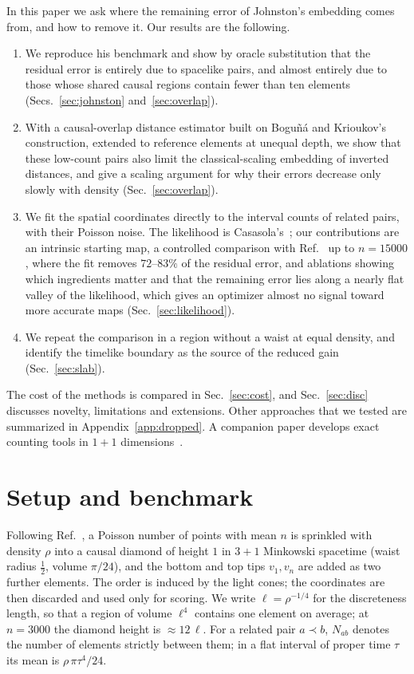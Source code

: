 \documentclass[prd,twocolumn,superscriptaddress,nofootinbib,amsmath,amssymb,floatfix]{revtex4-2}
\begin{document}
In this paper we ask where the remaining error of Johnston's embedding comes from, and how to remove it. Our results are the following.
\begin{enumerate}
\item We reproduce his benchmark and show by oracle substitution that the residual error is entirely due to spacelike pairs, and almost entirely due to those whose shared causal regions contain fewer than ten elements (Secs.~\ref{sec:johnston} and~\ref{sec:overlap}).
\item With a causal-overlap distance estimator built on Bogu\~n\'a and Krioukov's construction, extended to reference elements at unequal depth, we show that these low-count pairs also limit the classical-scaling embedding of inverted distances, and give a scaling argument for why their errors decrease only slowly with density (Sec.~\ref{sec:overlap}).
\item We fit the spatial coordinates directly to the interval counts of related pairs, with their Poisson noise. The likelihood is Casasola's~\cite{Casasola26}; our contributions are an intrinsic starting map, a controlled comparison with Ref.~\cite{Johnston25} up to $n=15000$, where the fit removes $72$--$83\%$ of the residual error, and ablations showing which ingredients matter and that the remaining error lies along a nearly flat valley of the likelihood, which gives an optimizer almost no signal toward more accurate maps (Sec.~\ref{sec:likelihood}).
\item We repeat the comparison in a region without a waist at equal density, and identify the timelike boundary as the source of the reduced gain (Sec.~\ref{sec:slab}).
\end{enumerate}
The cost of the methods is compared in Sec.~\ref{sec:cost}, and Sec.~\ref{sec:disc} discusses novelty, limitations and extensions. Other approaches that we tested are summarized in Appendix~\ref{app:dropped}. A companion paper develops exact counting tools in $1+1$ dimensions~\cite{Toolkit}.

\section{Setup and benchmark}\label{sec:setup}
Following Ref.~\cite{Johnston25}, a Poisson number of points with mean $n$ is sprinkled with density $\rho$ into a causal diamond of height $1$ in $3+1$ Minkowski spacetime (waist radius $\tfrac12$, volume $\pi/24$), and the bottom and top tips $v_1,v_n$ are added as two further elements. The order is induced by the light cones; the coordinates are then discarded and used only for scoring. We write $\ell=\rho^{-1/4}$ for the discreteness length, so that a region of volume $\ell^4$ contains one element on average; at $n=3000$ the diamond height is $\approx 12\,\ell$. For a related pair $a\prec b$, $N_{ab}$ denotes the number of elements strictly between them; in a flat interval of proper time $\tau$ its mean is $\rho\,\pi\tau^4/24$.
\end{document}
